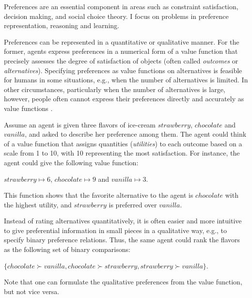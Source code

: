 
Preferences are an essential component in areas such as constraint 
satisfaction, decision making, and social choice theory. 
I focus on problems in preference representation, reasoning and learning.

Preferences can be represented in a quantitative or qualitative manner.
For the former, agents express preferences in a numerical form of
a value function that precisely assesses the degree of satisfaction
of objects
(often called \textit{outcomes} or \textit{alternatives}).
Specifying preferences as value functions on alternatives
is feasible for humans in some situations, e.g., 
when the number of alternatives is limited.
In other circumstances, particularly when the number of alternatives is large, however,
people often cannot express their 
preferences directly and accurately as value 
functions \cite{Domshlak20111037}.

Assume an agent is given three flavors of ice-cream 
$strawberry$, $chocolate$ and $vanilla$, and asked to describe 
her preference among them.
The agent could think of a value function that
assigns quantities (\textit{utilities}) to each outcome
based on a scale from 1 to 10, with 10 representing the most satisfaction.
For instance, the agent could give the following value function:
\begin{center}
	$strawberry \mapsto 6$, $chocolate \mapsto 9$ and $vanilla \mapsto 3$.
\end{center}
This function shows that the favorite alternative to the agent is
$chocolate$ with the highest utility, and
$strawberry$ is preferred over $vanilla$.

Instead of rating alternatives quantitatively, it is
often easier and more intuitive to give preferential information
in small pieces in a qualitative way,
e.g., to specify binary preference relations.
Thus, the same agent could rank the flavors as the following
set of binary comparisons:
\begin{center}
	$\{chocolate \succ vanilla, chocolate \succ strawberry,
	strawberry \succ vanilla\}$.
\end{center}
Note that one can formulate the qualitative preferences from
the value function, but not vice versa.

